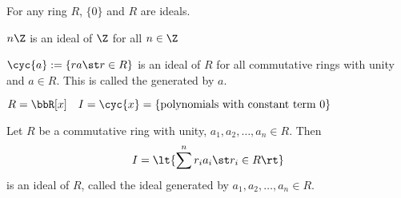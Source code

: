 \begin{example}
  For any ring \( R \), \( \{0\} \) and \( R \) are ideals.
\end{example}

\begin{example}
  \( n\Z \) is an ideal of \( \Z \) for all \( n\in\Z \)
\end{example}

\begin{example}
  \( \cyc{a}:=\{ra\st r\in R\} \) is an ideal of \( R \) for all commutative rings with unity and \( a\in R \). This is called the  generated by \( a \).
\end{example}

\begin{example}
  \( R=\bbR[x]\quad I=\cyc{x}= \{\text{polynomials with constant term 0}\} \)
\end{example}

\begin{example}
  Let \( R \) be a commutative ring with unity, \( a_1,a_2,\ldots,a_n\in R \). Then
  \begin{align*}
    I = \lt\{\sum^n  r_ia_i \st r_i\in R\rt\}
  \end{align*}
  is an ideal of \( R \), called the ideal generated by \( a_1,a_2,\ldots,a_n\in R \).
\end{example}

